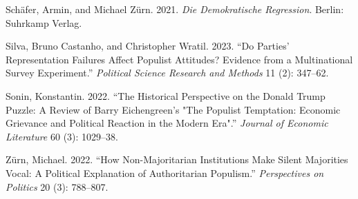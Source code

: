 \documentclass[
]{article}
\newlength{\cslhangindent}
\newlength{\cslentryspacingunit} %
\newenvironment{CSLReferences}[2] %
 {%
  \setlength{\parindent}{0pt}
  \ifodd #1
  \let\oldpar\par
  \def\par{\hangindent=\cslhangindent\oldpar}
  \fi
  \setlength{\parskip}{#2\cslentryspacingunit}
 }%
 {}
\begin{document}
\begin{CSLReferences}{1}{0}
\leavevmode{}%
Schäfer, Armin, and Michael Zürn. 2021. \emph{Die Demokratische
{Regression}}. Berlin: Suhrkamp Verlag.

\leavevmode{}%
Silva, Bruno Castanho, and Christopher Wratil. 2023. {``Do Parties'
Representation Failures Affect Populist Attitudes? {Evidence} from a
Multinational Survey Experiment.''} \emph{Political Science Research and
Methods} 11 (2): 347--62.

\leavevmode{}%
Sonin, Konstantin. 2022. {``The {Historical} {Perspective} on the
{Donald} {Trump} {Puzzle}: {A} {Review} of {Barry} {Eichengreen}'s
"{The} {Populist} {Temptation}: {Economic} {Grievance} and {Political}
{Reaction} in the {Modern} {Era}".''} \emph{Journal of Economic
Literature} 60 (3): 1029--38.

\leavevmode{}%
Zürn, Michael. 2022. {``How {Non}-{Majoritarian} {Institutions} {Make}
{Silent} {Majorities} {Vocal}: {A} {Political} {Explanation} of
{Authoritarian} {Populism}.''} \emph{Perspectives on Politics} 20 (3):
788--807.

\end{CSLReferences}
\end{document}
